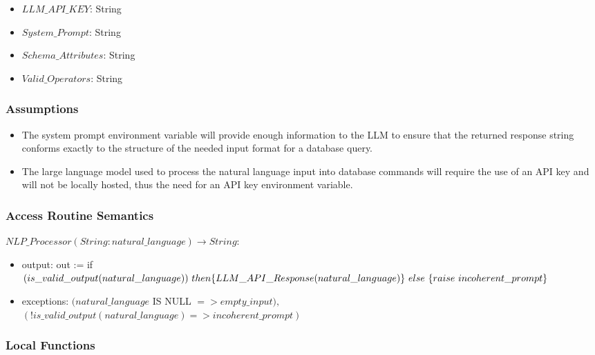 \documentclass[12pt, titlepage]{article}
\begin{document}
\begin{itemize}

  \item{$LLM\_API\_KEY$: String}
  \item{$System\_Prompt$: String}
  \item{$Schema\_Attributes$: String{}}
  \item{$Valid\_Operators$: String{}}

\end{itemize}

\subsubsection{Assumptions}

\begin{itemize}

  \item{The system prompt environment variable will provide enough information to the LLM to ensure that the returned response string conforms exactly
  to the structure of the needed input format for a database query.}
  \item{The large language model used to process the natural language input into database commands will require the use of an API key and will not
  be locally hosted, thus the need for an API key environment variable.}


\end{itemize}


\subsubsection{Access Routine Semantics}

\noindent $NLP\_Processor(String: natural\_language) \rightarrow String$:
\begin{itemize}
\item output: out := if $(is\_valid\_output(natural\_language))~then~
\\ \{LLM\_API\_Response(natural\_language)\}~else~\{raise~incoherent\_prompt\}$ 
\item exceptions: $(natural\_language$ IS NULL $=> empty\_input),$ \\
$(!is\_valid\_output(natural\_language) => incoherent\_prompt)$
\end{itemize}

\subsubsection{Local Functions}
\end{document}
